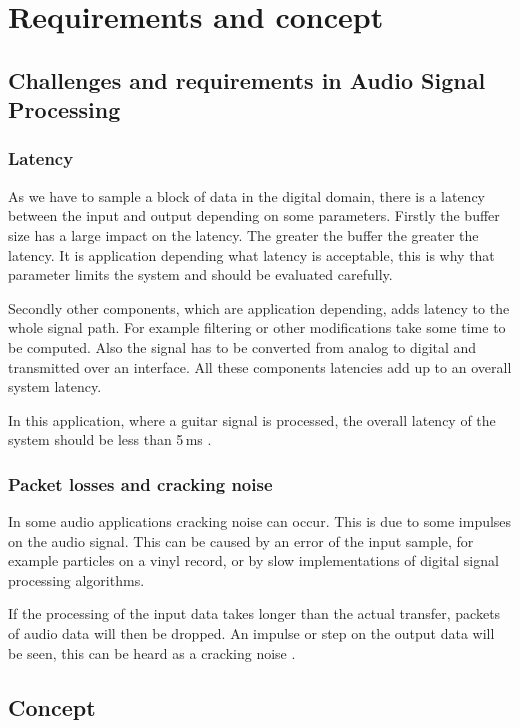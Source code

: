 \section{Requirements and concept}

\subsection{Challenges and requirements in Audio Signal Processing}

\subsubsection{Latency}

As we have to sample a block of data in the digital domain, there is a latency between the input and output
depending on some parameters. Firstly the buffer size has a large impact on the latency. The greater the buffer the
greater the latency. It is application depending what latency is acceptable, this is why that parameter
limits the system and should be evaluated carefully.

Secondly other components, which are application depending, adds latency to the whole signal path.
For example filtering or other modifications take some time to be computed. Also the signal has to
be converted from analog to digital and transmitted over an interface. All these components latencies add
up to an overall system latency. 

In this application, where a guitar signal is processed, the overall latency of the system should be less
than 5\,ms \cite{beckmann_dsp}. %

\subsubsection{Packet losses and cracking noise} %

In some audio applications cracking noise can occur. This is due to
some impulses on the audio signal. This can be caused by an error of the input sample, for example particles
on a vinyl record, or by slow implementations of digital signal processing algorithms.

If the processing of the input data takes longer than the actual transfer, packets of audio data will
then be dropped. An impulse or step on the output data will be seen, this can be heard as a cracking noise
\cite{stotz_audio_video}.

\subsection{Concept}

